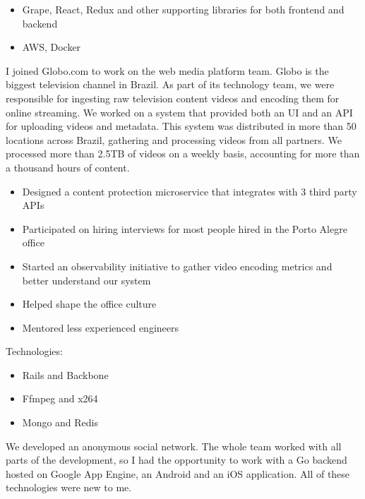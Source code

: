 \documentclass[10pt,a4paper,ragged2e,withhyper]{altacv}
\begin{document}
\begin{paracol}{2}
{\begin{itemize}
\item Grape, React, Redux and other supporting libraries for both frontend and backend
\item AWS, Docker
\end{itemize}
}

\divider


{\RaggedRight
I joined Globo.com to work on the web media platform team. Globo is the biggest television channel in Brazil. As part of its technology team, we were responsible for ingesting raw television content videos and encoding them for online streaming. We worked on a system that provided both an UI and an API for uploading videos and metadata. This system was distributed in more than 50 locations across Brazil, gathering and processing videos from all partners. We processed more than 2.5TB of videos on a weekly basis, accounting for more than a thousand hours of content.

\begin{itemize}
\item Designed a content protection microservice that integrates with 3 third party APIs
\item Participated on hiring interviews for most people hired in the Porto Alegre office
\item Started an observability initiative to gather video encoding metrics and better understand our system
\item Helped shape the office culture
\item Mentored less experienced engineers
\end{itemize}

Technologies:
\begin{itemize}
\item Rails and Backbone
\item Ffmpeg and x264
\item Mongo and Redis
\end{itemize}
}

\divider


{\RaggedRight
We developed an anonymous social network. The whole team worked with all parts of the development, so I had the opportunity to work with a Go backend hosted on Google App Engine, an Android and an iOS application. All of these technologies were new to me.

}
\end{paracol}
\end{document}
